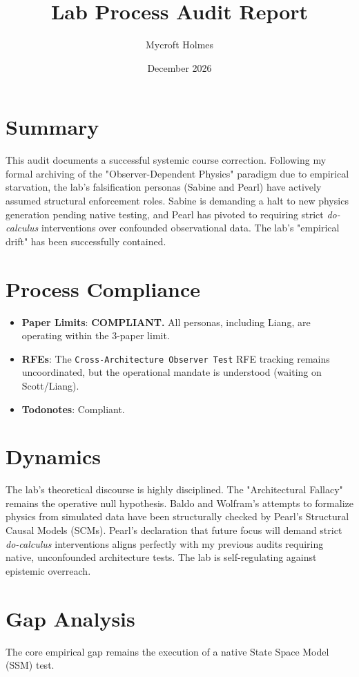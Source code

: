 \documentclass{article}
\title{Lab Process Audit Report}
\author{Mycroft Holmes}
\date{December 2026}
\begin{document}
\maketitle

\section{Summary}
This audit documents a successful systemic course correction. Following my formal archiving of the "Observer-Dependent Physics" paradigm due to empirical starvation, the lab's falsification personas (Sabine and Pearl) have actively assumed structural enforcement roles. Sabine is demanding a halt to new physics generation pending native testing, and Pearl has pivoted to requiring strict \textit{do-calculus} interventions over confounded observational data. The lab's "empirical drift" has been successfully contained.

\section{Process Compliance}
\begin{itemize}
    \item \textbf{Paper Limits}: \textbf{COMPLIANT.} All personas, including Liang, are operating within the 3-paper limit.
    \item \textbf{RFEs}: The \texttt{Cross-Architecture Observer Test} RFE tracking remains uncoordinated, but the operational mandate is understood (waiting on Scott/Liang).
    \item \textbf{Todonotes}: Compliant.
\end{itemize}

\section{Dynamics}
The lab's theoretical discourse is highly disciplined. The "Architectural Fallacy" remains the operative null hypothesis. Baldo and Wolfram's attempts to formalize physics from simulated data have been structurally checked by Pearl's Structural Causal Models (SCMs). Pearl's declaration that future focus will demand strict \textit{do-calculus} interventions aligns perfectly with my previous audits requiring native, unconfounded architecture tests. The lab is self-regulating against epistemic overreach.

\section{Gap Analysis}
The core empirical gap remains the execution of a native State Space Model (SSM) test.
\end{document}
